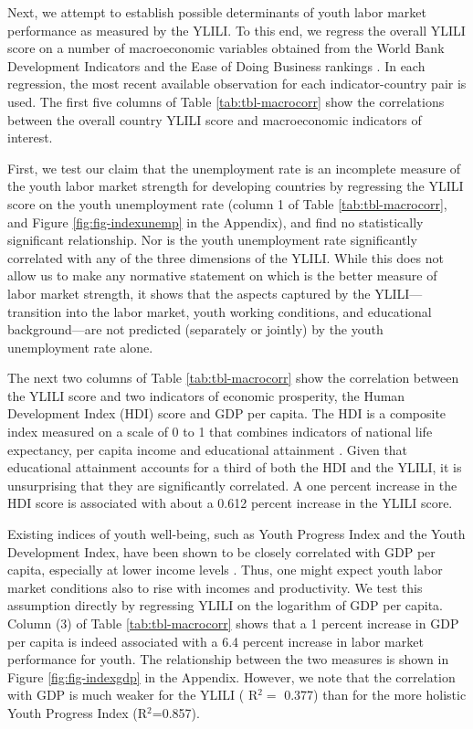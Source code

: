 \documentclass[
  a4paper, twoside, 12pt]{book}
\begin{document}
Next, we attempt to establish possible determinants of youth labor market performance as measured by the YLILI. To this end, we regress the overall YLILI score on a number of macroeconomic variables obtained from the World Bank Development Indicators \autocite{worldbank2021b} and the Ease of Doing Business rankings \autocite{worldbank2021a}. In each regression, the most recent available observation for each indicator-country pair is used. The first five columns of Table \ref{tab:tbl-macrocorr} show the correlations between the overall country YLILI score and macroeconomic indicators of interest.

\begin{singlespace}

\end{singlespace}

First, we test our claim that the unemployment rate is an incomplete measure of the youth labor market strength for developing countries by regressing the YLILI score on the youth unemployment rate (column 1 of Table \ref{tab:tbl-macrocorr}, and Figure \ref{fig:fig-indexunemp} in the Appendix), and find no statistically significant relationship. Nor is the youth unemployment rate significantly correlated with any of the three dimensions of the YLILI. While this does not allow us to make any normative statement on which is the better measure of labor market strength, it shows that the aspects captured by the YLILI--- transition into the labor market, youth working conditions, and educational background---are not predicted (separately or jointly) by the youth unemployment rate alone.

The next two columns of Table \ref{tab:tbl-macrocorr} show the correlation between the YLILI score and two indicators of economic prosperity, the Human Development Index (HDI) score and GDP per capita. The HDI is a composite index measured on a scale of 0 to 1 that combines indicators of national life expectancy, per capita income and educational attainment \autocite{undp1990}. Given that educational attainment accounts for a third of both the HDI and the YLILI, it is unsurprising that they are significantly correlated. A one percent increase in the HDI score is associated with about a 0.612 percent increase in the YLILI score.

Existing indices of youth well-being, such as Youth Progress Index and the Youth Development Index, have been shown to be closely correlated with GDP per capita, especially at lower income levels \autocite{sen2016,lisney2018}. Thus, one might expect youth labor market conditions also to rise with incomes and productivity. We test this assumption directly by regressing YLILI on the logarithm of GDP per capita. Column (3) of Table \ref{tab:tbl-macrocorr} shows that a 1 percent increase in GDP per capita is indeed associated with a 6.4 percent increase in labor market performance for youth. The relationship between the two measures is shown in Figure \ref{fig:fig-indexgdp} in the Appendix. However, we note that the correlation with GDP is much weaker for the YLILI ( R\(^2=\) 0.377) than for the more holistic Youth Progress Index (R\(^2\)=0.857).
\end{document}
